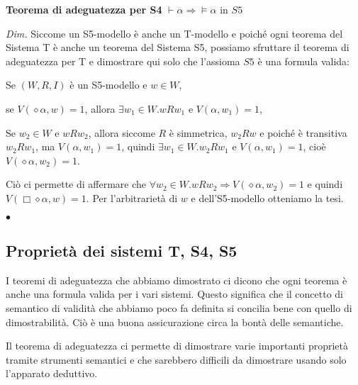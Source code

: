 \documentclass[a4paper, titlepage, 12pt]{report}
\begin{document}
\begin{flushleft}
\textbf{Teorema di adeguatezza per S4}
$\vdash \alpha \Rightarrow \vDash \alpha$ in $S5$

\textit{Dim.}
Siccome un S5-modello è anche un T-modello e poiché ogni teorema del Sistema T
è anche un teorema del Sistema S5, possiamo sfruttare il teorema di adeguatezza per T
e dimostrare qui solo che l'assioma $S5$ è una formula valida:

Se $(W, R, I)$ è un S5-modello e $w \in W$,

se $V(\diamond \alpha, w) = 1$, allora $\exists w_1 \in W. wRw_1$ e $V(\alpha, w_1) = 1$,

Se $w_2 \in W$ e $wRw_2$, allora siccome $R$ è simmetrica, $w_2Rw$ e poiché
è transitiva $w_2Rw_1$, ma $V(\alpha, w_1) = 1$, quindi
$\exists w_1 \in W. w_2Rw_1$ e $V(\alpha, w_1) = 1$, cioè $V(\diamond \alpha, w_2) = 1$.

Ciò ci permette di affermare che $\forall w_2 \in W. wRw_2 \Rightarrow V(\diamond \alpha, w_2) = 1$
e quindi $V(\Box \diamond \alpha, w) = 1$.
Per l'arbitrarietà di $w$ e dell'S5-modello otteniamo la tesi.

\begin{flushright}
$\bullet$
\end{flushright}
\end{flushleft}

\subsection{Proprietà dei sistemi T, S4, S5}
I teoremi di adeguatezza che abbiamo dimostrato ci dicono che ogni teorema
è anche una formula valida per i vari sistemi.
Questo significa che il concetto di semantico di validità che abbiamo poco fa definita
si concilia bene con quello di dimostrabilità. Ciò è una buona assicurazione circa
la bontà delle semantiche.

Il teorema di adeguatezza ci permette di dimostrare varie importanti proprietà tramite
strumenti semantici e che sarebbero difficili da dimostrare usando solo l'apparato deduttivo.
\end{document}

